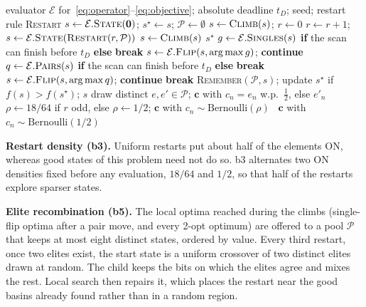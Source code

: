\documentclass[runningheads]{llncs}
\newcommand{\bts}{\textsc{b35}}
\begin{document}
\begin{algorithm}[t]
\caption{Deadline-bounded exact pair search with a restart rule (\textsc{pair}, b3, b5, \bts{})}\label{alg:pair}
\footnotesize
\begin{algorithmic}[1]
\Require evaluator $\mathcal E$ for~\eqref{eq:operator}--\eqref{eq:objective}; absolute deadline $t_D$; seed; restart rule \textsc{Restart}
\State $s\gets\mathcal E.\textsc{State}(\mathbf 0)$; $s^\star\gets s$; $\mathcal P\gets\emptyset$ 
\State $s\gets\textsc{Climb}(s)$; $r\gets0$
  \State $r\gets r+1$; $s\gets\mathcal E.\textsc{State}(\textsc{Restart}(r,\mathcal P))$ 
  \State $s\gets\textsc{Climb}(s)$
\EndWhile
\State \Return $s^\star$
\Statex
{}
  \Loop
    \State $g\gets\mathcal E.\textsc{Singles}(s)$ \textbf{if} the scan can finish before $t_D$ \textbf{else} \textbf{break} 
     $s\gets\mathcal E.\textsc{Flip}(s,\arg\max g)$; \textbf{continue} \EndIf
    \State $q\gets\mathcal E.\textsc{Pairs}(s)$ \textbf{if} the scan can finish before $t_D$ \textbf{else} \textbf{break} 
     $s\gets\mathcal E.\textsc{Flip}(s,\arg\max q)$; \textbf{continue} \EndIf
    \State \textbf{break} 
  \EndLoop
  \State \textsc{Remember}$(\mathcal P,s)$; update $s^\star$ if $f(s)>f(s^\star)$; \Return $s$
\EndFunction
\Statex
{} 
  \If{\bts{} or b5, $|\mathcal P|\ge2$ and $r\bmod3=0$}
    \State draw distinct $e,e'\in\mathcal P$; \Return $\mathbf c$ with $c_n=e_n$ w.p.\ $\tfrac12$, else $e'_n$ 
  \ElsIf{\bts{} or b3}
    \State $\rho\gets 18/64$ if $r$ odd, else $\rho\gets 1/2$; \Return $\mathbf c$ with $c_n\sim\mathrm{Bernoulli}(\rho)$ 
  \Else\ \Return $\mathbf c$ with $c_n\sim\mathrm{Bernoulli}(1/2)$ 
  \EndIf
\EndFunction
\end{algorithmic}
\end{algorithm}

\textbf{Restart density (b3).} Uniform restarts put about half of the elements ON, whereas good states of this problem need not do so. b3 alternates two ON densities fixed before any evaluation, $18/64$ and $1/2$, so that half of the restarts explore sparser states.

\textbf{Elite recombination (b5).} The local optima reached during the climbs (single-flip optima after a pair move, and every 2-opt optimum) are offered to a pool $\mathcal P$ that keeps at most eight distinct states, ordered by value. Every third restart, once two elites exist, the start state is a uniform crossover of two distinct elites drawn at random. The child keeps the bits on which the elites agree and mixes the rest. Local search then repairs it, which places the restart near the good basins already found rather than in a random region.
\end{document}
